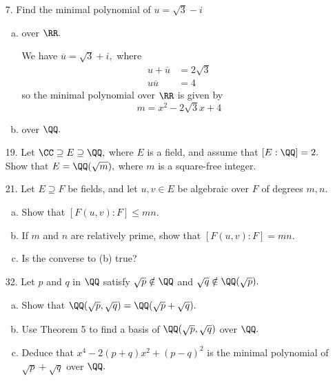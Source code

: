 \documentclass{article}
\begin{document}
\begin{itemize}
	\item[7.] Find the minimal polynomial of $u=\sqrt{3}-i$
		\begin{enumerate}[(a)]
			\item over $\RR.$
				\begin{soln}
					We have $\overline{u}=\sqrt{3}+i,$ where
					\begin{align*}
						u+\overline{u} &= 2\sqrt{3} \\
						u\overline{u} &= 4
					\end{align*}
					so the minimal polynomial over $\RR$ is given by
					\[m=x^2-2\sqrt{3} x + 4\]
				\end{soln}

			\item over $\QQ.$
				
		\end{enumerate}

	\item[19.] Let $\CC\supseteq E\supseteq \QQ,$ where $E$ is a field, and assume that $[E:\QQ]=2.$ Show that $E=\QQ(\sqrt{m}),$ where $m$ is a square-free integer.

	\item[21.] Let $E\supseteq F$ be fields, and let $u, v\in E$ be algebraic over $F$ of degrees $m, n.$
		\begin{enumerate}[(a)]
			\item Show that $[F(u, v):F]\le mn.$

			\item If $m$ and $n$ are relatively prime, show that $[F(u, v):F]=mn.$

			\item Is the converse to (b) true?
				
		\end{enumerate}

	\item[32.] Let $p$ and $q$ in $\QQ$ satisfy $\sqrt{p}\notin \QQ$ and $\sqrt{q}\notin \QQ(\sqrt{p}).$
		\begin{enumerate}[(a)]
			\item Show that $\QQ(\sqrt{p}, \sqrt{q})=\QQ(\sqrt{p}+\sqrt{q}).$

			\item Use Theorem 5 to find a basis of $\QQ(\sqrt{p}, \sqrt{q})$ over $\QQ.$

			\item Deduce that $x^4-2(p+q)x^2+(p-q)^2$ is the minimal polynomial of $\sqrt{p}+\sqrt{q}$ over $\QQ.$
				
		\end{enumerate}
		
\end{itemize}
\end{document}
